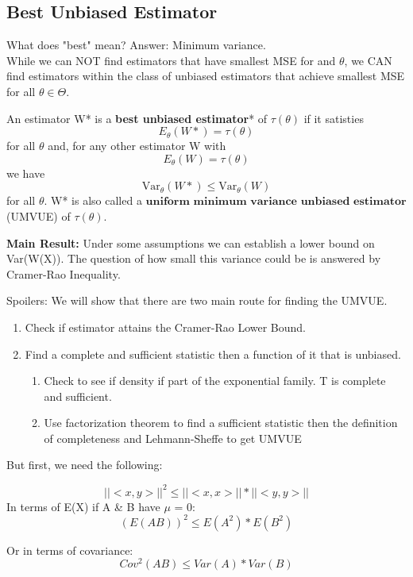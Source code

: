 \documentclass[11pt,fleqn]{book} %
\begin{document}
\subsection{Best Unbiased Estimator}
		What does "best" mean? Answer: Minimum variance. \\
	
	While we can NOT find estimators that have smallest MSE for and $\theta$, we CAN find estimators within the class of unbiased estimators that achieve smallest MSE for all $\theta \in \Theta$.\\

	\begin{definition}
		An estimator W* is a \textbf{best unbiased estimator}* of $\tau(\theta)$ if it satisties
		\[
			E_\theta (W*) = \tau(\theta)
		\] 
		for all $\theta$ and, for any other estimator W with 
		\[
			E_\theta (W) = \tau(\theta)
		\]
		we have 
		\[
			\text{Var}_\theta (W*) \le \text{Var}_\theta (W)
		\]
		for all $\theta$. W* is also called a $\textbf{uniform minimum variance unbiased estimator}$ (UMVUE) of $\tau(\theta)$.
	\end{definition}

	\textbf{Main Result:} Under some assumptions we can establish a lower bound on Var(W(X)). The question of how small this variance could be is answered by Cramer-Rao Inequality.

	\begin{remark}
		Spoilers: We will show that there are two main route for finding the UMVUE. 
		\begin{enumerate}
			\item Check if estimator attains the Cramer-Rao Lower Bound. 
			\item Find a complete and sufficient statistic then a function of it that is unbiased. 
			\begin{enumerate}
				\item Check to see if density if part of the exponential family. T is complete and sufficient.
				\item Use factorization theorem to find a sufficient statistic then the definition of completeness and Lehmann-Sheffe to get UMVUE
			\end{enumerate}
		\end{enumerate}
	\end{remark}

	But first, we need the following:

	\begin{theorem}
		$$||<x,y>||^2 \le ||<x,x>|| * ||<y,y>||$$
	In terms of E(X) if A \& B have $\mu$ = 0:
	$$(E(AB))^2 \le E(A^2) * E(B^2)$$

	Or in terms of covariance:
	$$Cov^2(AB) \le Var(A)*Var(B)$$
	\end{theorem}
	
\end{document}

